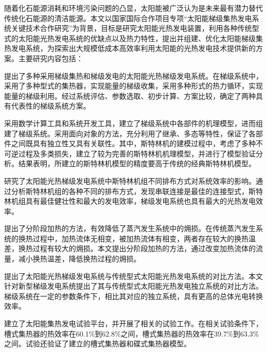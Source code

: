 {随着化石能源消耗和环境污染问题的凸显，太阳能被广泛认为是未来最有潜力替代传统化石能源的清洁能源。本文以国家国际合作项目专项“太阳能梯级集热发电系统关键技术合作研究”为背景，目标是研究太阳能光热发电装置，利用各种传统型式的太阳能光热发电系统的优缺点以及热力特性，提出并组建、优化太阳能梯级集热发电系统，为探索出大规模低成本高效率利用太阳能的光热发电技术提供新的方案。主要研究内容包括：

提出了多种采用梯级集热和梯级发电的太阳能光热梯级发电系统。在梯级系统中，采用了多种型式的集热器，实现能量的梯级收集，采用多种形式的热力循环，实现能量的梯级利用。经过系统评估、参数选取、初步计算、方案比较，确定了两种具有代表性的梯级系统方案。

采用数学计算工具和系统开发工具，建立了梯级系统中各部件的机理模型，进而组建了梯级系统。采用面向对象的方法，充分利用了继承、多态等特性，保证了各部件之间既具有独立性又具有关联性。其中，斯特林机的建模过程中，考虑了多种不可逆过程及多类损失，建立了较为完善的斯特林机机理模型，并进行了模型验证分析。结果表明，所建立的斯特林机模型的精度要高于传统的经典斯特林机模型。

研究了太阳能光热梯级发电系统中斯特林机组不同排布方式对系统效率的影响。通过分析斯特林机组的各种不同的排布方式，发现串联连接是最佳的连接型式，斯特林机组具有最佳健壮性和最大的发电效率，梯级发电系统也具有最大的光热发电效率。

提出了分阶段加热的方法，有效降低了蒸汽发生系统中的㶲损。在传统蒸汽发生系统的换热过程中，加热流体无相变，被加热流体有相变，两者存在较大的换热温差，换热过程有较大的㶲损。本文提出分阶段加热的方法，通过改变加热流体的流量，减小换热温差，降低换热过程的㶲损。

提出了太阳能光热梯级发电系统与传统型式太阳能光热发电系统的对比方法。本文针对新型梯级发电系统提出了其与传统型式太阳能光热发电独立系统的对比方法。梯级系统在一定的参数条件下，相比其对应的独立系统，具有更高的总体光电转换效率。

建立了太阳能集热发电试验平台，并开展了相关的试验工作。在相关试验条件下，槽式集热器的热效率在60.1\%到62.8\%之间，槽式集热器的热效率在39.7\%到63.3\%之间。试验还验证了建立的槽式集热器和碟式集热器模型。
}

